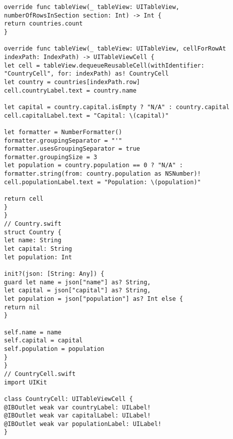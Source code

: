 \begin{lstlisting}
override func tableView(_ tableView: UITableView, numberOfRowsInSection section: Int) -> Int {
return countries.count
}

override func tableView(_ tableView: UITableView, cellForRowAt indexPath: IndexPath) -> UITableViewCell {
let cell = tableView.dequeueReusableCell(withIdentifier: "CountryCell", for: indexPath) as! CountryCell
let country = countries[indexPath.row]
cell.countryLabel.text = country.name

let capital = country.capital.isEmpty ? "N/A" : country.capital
cell.capitalLabel.text = "Capital: \(capital)"

let formatter = NumberFormatter()
formatter.groupingSeparator = "'"
formatter.usesGroupingSeparator = true
formatter.groupingSize = 3
let population = country.population == 0 ? "N/A" : formatter.string(from: country.population as NSNumber)!
cell.populationLabel.text = "Population: \(population)"

return cell
}
}
// Country.swift
struct Country {
let name: String
let capital: String
let population: Int

init?(json: [String: Any]) {
guard let name = json["name"] as? String,
let capital = json["capital"] as? String,
let population = json["population"] as? Int else {
return nil
}

self.name = name
self.capital = capital
self.population = population
}
}
// CountryCell.swift
import UIKit

class CountryCell: UITableViewCell {
@IBOutlet weak var countryLabel: UILabel!
@IBOutlet weak var capitalLabel: UILabel!
@IBOutlet weak var populationLabel: UILabel!
}
\end{lstlisting}

